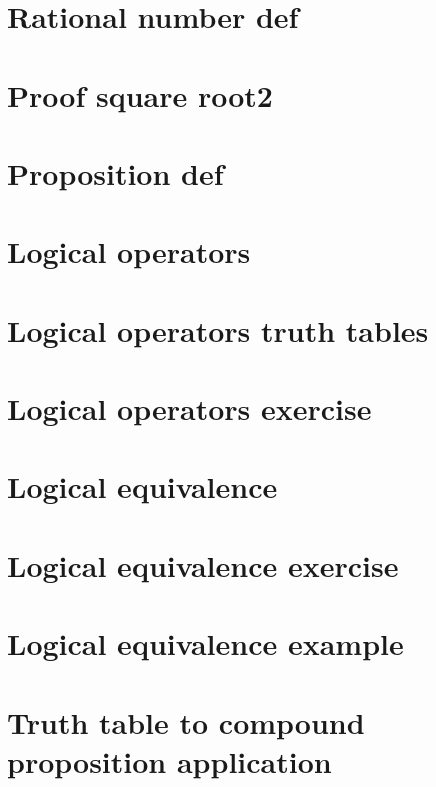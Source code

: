 \section*{Rational number def}

\vfill
\section*{Proof square root2}

\vfill
\section*{Proposition def}

\vfill
\section*{Logical operators}

\vfill
\section*{Logical operators truth tables}

\vfill
\section*{Logical operators exercise}

\vfill
\section*{Logical equivalence}

\vfill
\section*{Logical equivalence exercise}

\vfill
\section*{Logical equivalence example}

\vfill
\section*{Truth table to compound proposition application}

\vfill
